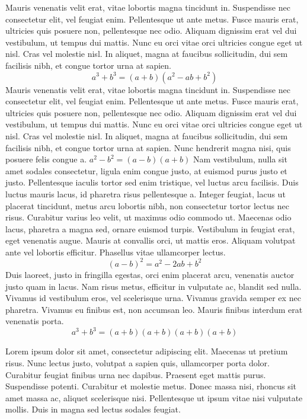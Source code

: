 \documentclass{article}
\begin{document}
Mauris venenatis velit erat, vitae lobortis magna tincidunt in. Suspendisse nec consectetur elit, vel feugiat enim. Pellentesque ut ante metus. Fusce mauris erat, ultricies quis posuere non, pellentesque nec odio. Aliquam dignissim erat vel dui vestibulum, ut tempus dui mattis. Nunc eu orci vitae orci ultricies congue eget ut nisl. Cras vel molestie nisl. In aliquet, magna at faucibus sollicitudin, dui sem facilisis nibh, et congue tortor urna at sapien.
\[ a^{3} + b^{3} = (a+b)(a^{2}-ab+b^{2}) \]
Mauris venenatis velit erat, vitae lobortis magna tincidunt in. Suspendisse nec consectetur elit, vel feugiat enim. Pellentesque ut ante metus. Fusce mauris erat, ultricies quis posuere non, pellentesque nec odio. Aliquam dignissim erat vel dui vestibulum, ut tempus dui mattis. Nunc eu orci vitae orci ultricies congue eget ut nisl. Cras vel molestie nisl. In aliquet, magna at faucibus sollicitudin, dui sem facilisis nibh, et congue tortor urna at sapien.
Nunc hendrerit magna nisi, quis posuere felis congue a.
\begin{math}
    a^{2}-b^{2} = (a - b)(a + b)
\end{math}
Nam vestibulum, nulla sit amet sodales consectetur, ligula enim congue justo, at euismod purus justo et justo. Pellentesque iaculis tortor sed enim tristique, vel luctus arcu facilisis. Duis luctus mauris lacus, id pharetra risus pellentesque a. Integer feugiat, lacus ut placerat tincidunt, metus arcu lobortis nibh, non consectetur tortor lectus nec risus. Curabitur varius leo velit, ut maximus odio commodo ut. Maecenas odio lacus, pharetra a magna sed, ornare euismod turpis. Vestibulum in feugiat erat, eget venenatis augue. Mauris at convallis orci, ut mattis eros. Aliquam volutpat ante vel lobortis efficitur. Phasellus vitae ullamcorper lectus.
\begin{equation}
(a-b)^{2}=a^{2}-2ab+b^{2} 
\end{equation}
Duis laoreet, justo in fringilla egestas, orci enim placerat arcu, venenatis auctor justo quam in lacus. Nam risus metus, efficitur in vulputate ac, blandit sed nulla. Vivamus id vestibulum eros, vel scelerisque urna. Vivamus gravida semper ex nec pharetra. Vivamus eu finibus est, non accumsan leo. Mauris finibus interdum erat venenatis porta. 
\begin{displaymath}
a^{3} + b^{3} = (a+b)(a+b)(a+b)(a+b)
\end{displaymath}

Lorem ipsum dolor sit amet, consectetur adipiscing elit. Maecenas ut pretium risus. Nunc lectus justo, volutpat a sapien quis, ullamcorper porta dolor. Curabitur feugiat finibus urna nec dapibus. Praesent eget mattis purus. Suspendisse potenti. Curabitur et molestie metus. Donec massa nisi, rhoncus sit amet massa ac, aliquet scelerisque nisi. Pellentesque ut ipsum vitae nisi vulputate mollis. Duis in magna sed lectus sodales feugiat.
\end{document}
